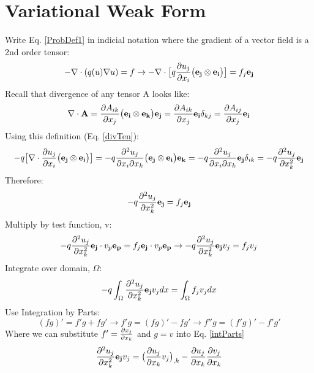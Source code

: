 \documentclass[12pt,3p]{article}
\begin{document}
\section{Variational Weak Form}
Write Eq. \ref{ProbDef1} in indicial notation where the gradient of a vector field is a 2nd order tensor: 
\begin{equation*}
- \nabla \cdot (q(u) \nabla u ) = f \rightarrow - \nabla \cdot \big[ q \pdv{u_j}{x_i} \big( \mathbf{e_j} \otimes \mathbf{e_i} \big) \big] = f_j \mathbf{e_j}
\end{equation*}
Recall that divergence of any tensor A looks like: 
\begin{equation}\label{divTen}
\nabla \cdot \mathbf{A} = \pdv{A_{ik}}{x_j} \big( \mathbf{e_i} \otimes \mathbf{e_k} \big) \mathbf{e_j} = \pdv{A_{ik}}{x_j} \mathbf{e_i} \delta_{kj} = \pdv{A_{ij}}{x_j} \mathbf{e_i}
\end{equation}
Using this definition (Eq. \ref{divTen}):
\begin{equation*}
- q \big[ \nabla \cdot \pdv{u_j}{x_i} \big( \mathbf{e_j} \otimes \mathbf{e_i} \big) \big] = - q \pdv[2]{u_j}{x_i}{x_k} \big( \mathbf{e_j} \otimes \mathbf{e_i} \big) \mathbf{e_k} = - q \pdv[2]{u_j}{x_i}{x_k} \mathbf{e_j} \delta_{ik} = -q \pdv[2]{u_j}{x_k} \mathbf{e_j}
\end{equation*}
Therefore:
\begin{equation*}
-q \pdv[2]{u_j}{x_k} \mathbf{e_j} = f_j \mathbf{e_j}
\end{equation*}
Multiply by test function, v: 
\begin{equation*}
-q \pdv[2]{u_j}{x_k} \mathbf{e_j} \cdot v_p \mathbf{e_p}= f_j \mathbf{e_j} \cdot v_p \mathbf{e_p} \rightarrow -q \pdv[2]{u_j}{x_k} \mathbf{e_j} v_j = f_j v_j
\end{equation*}
Integrate over domain, $\Omega$:
\begin{equation}\label{befIntParts}
-q \int_{\Omega} \pdv[2]{u_j}{x_k} \mathbf{e_j} v_j dx = \int_{\Omega} f_j v_j dx
\end{equation}
Use Integration by Parts:
\begin{equation}\label{intParts}
(fg)' = f'g + fg' \rightarrow f'g = (fg)' - fg' \rightarrow f''g = (f'g)' - f'g'
\end{equation}
Where we can substitute $f'= \pdv{x_j}{x_k}$ and $g = v$ into Eq. \ref{intParts}
\begin{equation*}
\pdv[2]{u_j}{x_k} \mathbf{e_j} v_j = \big( \pdv{u_j}{x_k} v_j \big)_{,k} - \pdv{u_j}{x_k} \pdv{v_j}{x_k}
\end{equation*}
\end{document}
